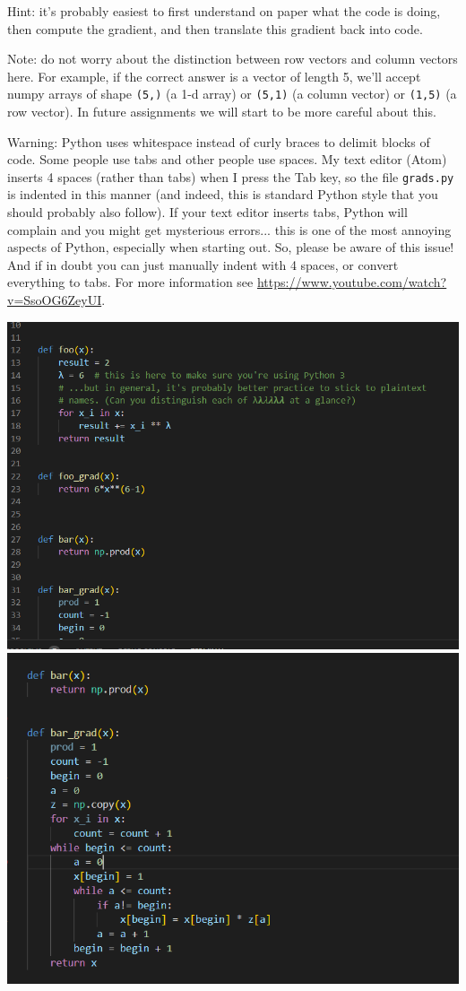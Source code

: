 \documentclass{article}
\begin{document}
Hint: it's probably easiest to first understand on paper what the code is doing, then compute
the gradient, and then translate this gradient back into code.

Note: do not worry about the distinction between row vectors and column vectors here.
For example, if the correct answer is a vector of length 5, we'll accept numpy arrays
of shape \texttt{(5,)} (a 1-d array) or \texttt{(5,1)} (a column vector) or
\texttt{(1,5)} (a row vector). In future assignments we will start to be more careful
about this.

Warning: Python uses whitespace instead of curly braces to delimit blocks of code.
Some people use tabs and other people use spaces. My text editor (Atom) inserts 4 spaces (rather than tabs) when
I press the Tab key, so the file \texttt{grads.py} is indented in this manner (and indeed, this is standard Python style that you should probably also follow). If your text editor inserts tabs,
Python will complain and you might get mysterious errors... this is one of the most annoying aspects
of Python, especially when starting out. So, please be aware of this issue! And if in doubt you can just manually
indent with 4 spaces, or convert everything to tabs. For more information see \url{https://www.youtube.com/watch?v=SsoOG6ZeyUI}.

\includegraphics{3_3_1}
\includegraphics{3_3_2}
\end{document}
